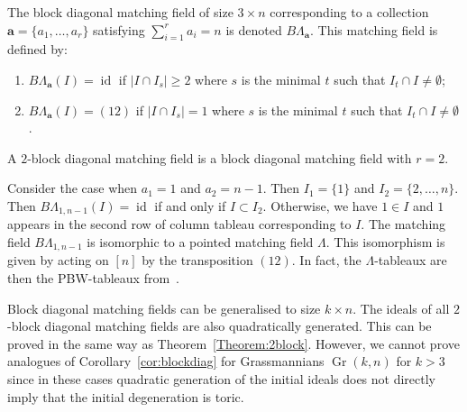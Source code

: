 \documentclass[ALCO,ThmDefs,Unicode,epreuves]{cedram}
\newcommand{\BLambda}{{B\Lambda}}
\DeclareMathOperator{\Gr}{Gr}
\DeclareMathOperator{\id}{id}
\begin{document}
\begin{Definition}\label{def:blockdiagcolumns}

The block diagonal matching field of size $3 \times n$ corresponding to a collection $\mathbf{a} = \{a_1, \ldots, a_{r}\}$ satisfying $\sum_{i = 1}^r a_i = n$ is denoted $\BLambda_{\mathbf{a}}$. This matching field is defined by:
\begin{enumerate}

\item $\BLambda_{\mathbf{a}}(I) = \id$ if $|I \cap I_s| \geq 2$ where $s$ is the minimal $t$ such that $I_t \cap I \neq \emptyset$;

\item \label{transpose} $\BLambda_{\mathbf{a}}(I) = (12)$ if $|I \cap I_s| = 1$ where $s$ is the minimal $t$ such that $I_t \cap I \neq \emptyset$. 

 \end{enumerate}
 A $2$-block diagonal matching field is a block diagonal matching field with $r = 2$. 
\end{Definition}

\begin{exam}
Consider the case when $a_1 = 1 $ and $a_2 = n-1$. Then $I_1 = \{1\}$ and $I_2 = \{2, \ldots , n\}$. 
Then $\BLambda_{1, n-1}(I) = \id$ if and only if $I \subset I_2$. Otherwise, we have $1 \in I$ and $1$ appears in the second row of column tableau corresponding to $I$.
The matching field $\BLambda_{1,n-1}$ is isomorphic to a pointed matching field $\Lambda$. This isomorphism is given by acting on $[n]$ by the transposition $(12)$. 
In fact, the $\Lambda$-tableaux are then the PBW-tableaux from~\cite{Feigen}.
 \end{exam}



 
\begin{Remark}\label{rem:higherblock}
Block diagonal matching fields can be generalised to size $k \times n$. The ideals of all $2$-block diagonal matching fields are also quadratically generated. This can be proved in the same way as Theorem~\ref{Theorem:2block}. However, we cannot prove analogues of Corollary~\ref{cor:blockdiag} for Grassmannians $\Gr (k, n)$ for $k >3$ since in these cases quadratic generation of the initial ideals does not directly imply that the initial degeneration is toric. 
\end{Remark}
\end{document}
